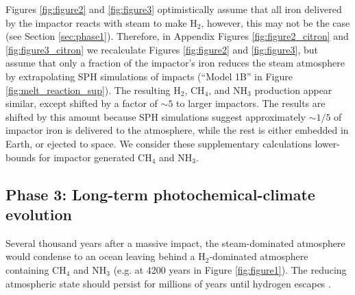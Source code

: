 Figures \ref{fig:figure2} and \ref{fig:figure3} optimistically assume that all iron delivered by the impactor reacts with steam to make H$_2$, however, this may not be the case (see Section \ref{sec:phase1}). Therefore, in Appendix Figures \ref{fig:figure2_citron} and \ref{fig:figure3_citron} we recalculate Figures \ref{fig:figure2} and \ref{fig:figure3}, but assume that only a fraction of the impactor's iron reduces the steam atmosphere by extrapolating SPH simulations of impacts (``Model 1B'' in Figure \ref{fig:melt_reaction_sup}). The resulting H$_2$, CH$_4$, and NH$_3$ production appear similar, except shifted by a factor of $\sim 5$ to larger impactors. The results are shifted by this amount because SPH simulations suggest approximately $\sim 1/5$ of impactor iron is delivered to the atmosphere, while the rest is either embedded in Earth, or ejected to space. We consider these supplementary calculations lower-bounds for impactor generated CH$_4$ and NH$_3$.

\subsection{Phase 3: Long-term photochemical-climate evolution} \label{sec:phase3}

Several thousand years after a massive impact, the steam-dominated atmosphere would condense to an ocean leaving behind a H$_2$-dominated atmosphere containing CH$_4$ and NH$_3$ (e.g. at 4200 years in Figure \ref{fig:figure1}). The reducing atmospheric state should persist for millions of years until hydrogen escapes \citep{Zahnle_2020}.

